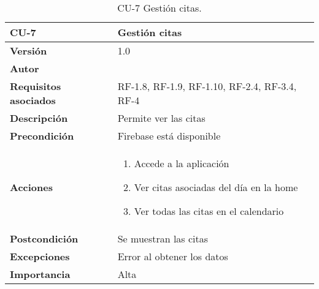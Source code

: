 \begin{table}[p]
	\centering
	\begin{tabularx}{\linewidth}{ p{} p{} }
		\toprule
		\textbf{CU-7}    & \textbf{Gestión citas}\\
		\toprule
		\textbf{Versión}              & 1.0    \\
		\textbf{Autor}                & {\nombre} \\
		\textbf{Requisitos asociados} & RF-1.8, RF-1.9, RF-1.10, RF-2.4, RF-3.4, RF-4 \\
		\textbf{Descripción}          & Permite ver las citas\\
		\textbf{Precondición}         & Firebase está disponible \\
		\textbf{Acciones}             &
		\begin{enumerate}
			\def\labelenumi{\arabic{enumi}.}
			\tightlist
			\item Accede a la aplicación
			\item Ver citas asociadas del día en la home
			\item Ver todas las citas en el calendario
		\end{enumerate}\\
		\textbf{Postcondición}        & Se muestran las citas \\
		\textbf{Excepciones}          & Error al obtener los datos \\
		\textbf{Importancia}          & Alta \\
		\bottomrule
	\end{tabularx}
	\caption{CU-7 Gestión citas.}
\end{table}


